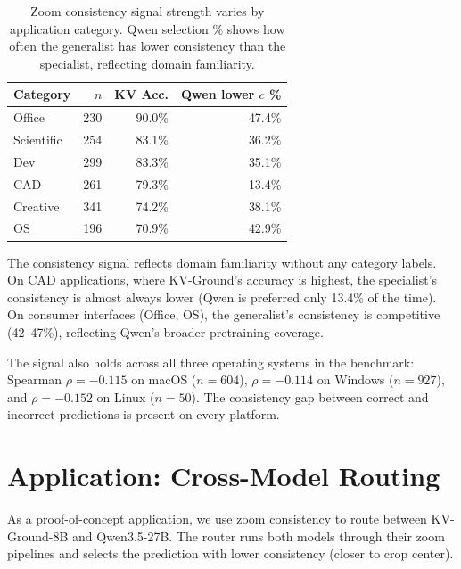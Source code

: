 \documentclass{article}
\begin{document}
\begin{table}[h]
\centering
\caption{Zoom consistency signal strength varies by application category. Qwen selection \% shows how often the generalist has lower consistency than the specialist, reflecting domain familiarity.}
\label{tab:category}
\begin{tabular}{lrrr}
\toprule
\textbf{Category} & \textbf{$n$} & \textbf{KV Acc.} & \textbf{Qwen lower $c$ \%} \\
\midrule
Office & 230 & 90.0\% & 47.4\% \\
Scientific & 254 & 83.1\% & 36.2\% \\
Dev & 299 & 83.3\% & 35.1\% \\
CAD & 261 & 79.3\% & 13.4\% \\
Creative & 341 & 74.2\% & 38.1\% \\
OS & 196 & 70.9\% & 42.9\% \\
\bottomrule
\end{tabular}
\end{table}

The consistency signal reflects domain familiarity without any category labels. On CAD applications, where KV-Ground's accuracy is highest, the specialist's consistency is almost always lower (Qwen is preferred only 13.4\% of the time). On consumer interfaces (Office, OS), the generalist's consistency is competitive (42--47\%), reflecting Qwen's broader pretraining coverage.

The signal also holds across all three operating systems in the benchmark: Spearman $\rho = -0.115$ on macOS ($n = 604$), $\rho = -0.114$ on Windows ($n = 927$), and $\rho = -0.152$ on Linux ($n = 50$). The consistency gap between correct and incorrect predictions is present on every platform.

\section{Application: Cross-Model Routing}

As a proof-of-concept application, we use zoom consistency to route between KV-Ground-8B and Qwen3.5-27B. The router runs both models through their zoom pipelines and selects the prediction with lower consistency (closer to crop center).

\end{document}
